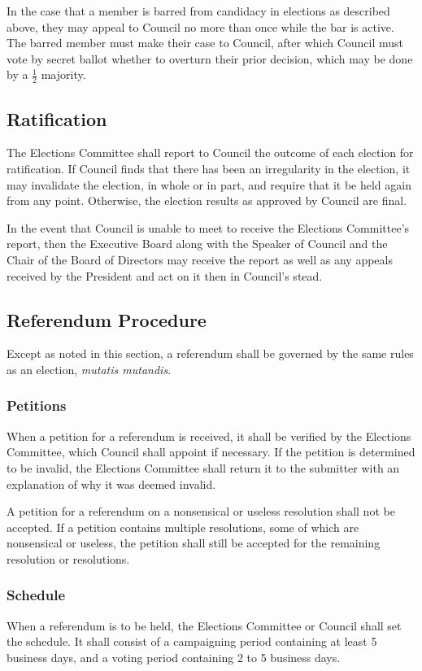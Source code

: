 In the case that a member is barred from candidacy in elections as described above, they may appeal to Council no more than once while the bar is active. The barred member must make their case to Council, after which Council must vote by secret ballot whether to overturn their prior decision, which may be done by a $\frac12$ majority.

\subsection{Ratification}
The Elections Committee shall report to Council the outcome of each election for ratification.
If Council finds that there has been an irregularity in the election, it may invalidate the election, in whole or in part, and require that it be held again from any point.
Otherwise, the election results as approved by Council are final.

In the event that Council is unable to meet to receive the Elections Committee's report, then the Executive Board along with the Speaker of Council and the Chair of the Board of Directors  may receive the report as well as any appeals received by the President and act on it then in Council's stead.

\subsection{Referendum Procedure}
Except as noted in this section, a referendum shall be governed by the same rules as an election, \emph{mutatis mutandis}.

\subsubsection{Petitions}
When a petition for a referendum is received, it shall be verified by the Elections Committee, which Council shall appoint if necessary.
If the petition is determined to be invalid, the Elections Committee shall return it to the submitter with an explanation of why it was deemed invalid.

A petition for a referendum on a nonsensical or useless resolution shall not be accepted.
If a petition contains multiple resolutions, some of which are nonsensical or useless, the petition shall still be accepted for the remaining resolution or resolutions.

\subsubsection{Schedule}
When a referendum is to be held, the Elections Committee or Council shall set the schedule.
It shall consist of a campaigning period containing at least 5 business days, and a voting period containing 2 to 5 business days.

